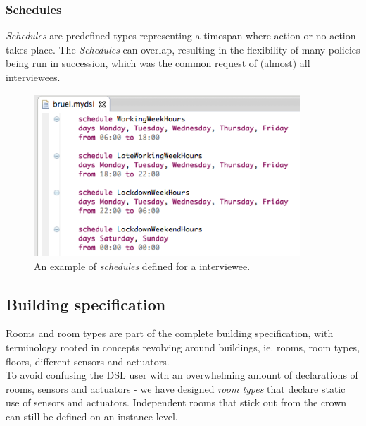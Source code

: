 \documentclass{llncs}
\begin{document}
\newpage
\subsubsection{Schedules}\label{subsubsec:schedules}
\textit{Schedules} are predefined types representing a timespan where action or no-action takes place. The \textit{Schedules} can overlap, resulting in the flexibility of many policies being run in succession, which was the common request of (almost) all interviewees.

\begin{figure}
  	\centering
    \includegraphics[width=10cm]{dsl-schedules.png}
	\caption{An example of \textit{schedules} defined for a interviewee.}
	\label{fig:dsl-schedules}
\end{figure}

\newpage
\subsection{Building specification}\label{subsec:buildingspecification}
Rooms and room types are part of the complete building specification, with terminology rooted in concepts revolving around buildings, ie. rooms, room types, floors, different sensors and actuators. \\

To avoid confusing the DSL user with an overwhelming amount of declarations of rooms, sensors and actuators - we have designed \textit{room types} that declare static use of sensors and actuators. Independent rooms that stick out from the crown can still be defined on an instance level.
\end{document}
